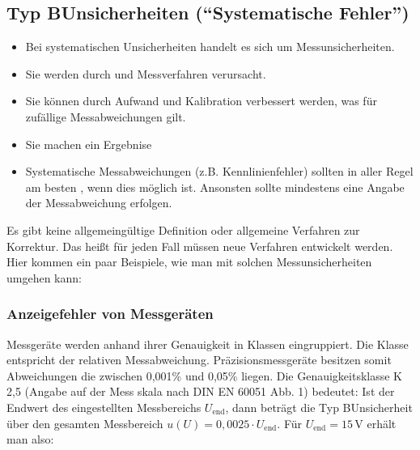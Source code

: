 \documentclass[letterpaper,10pt,english]{jupyterBook}
\begin{document}
\subsection{Typ B\sphinxhyphen{}Unsicherheiten (“Systematische Fehler”)}
\label{\detokenize{content/1_Messunsicherheiten:typ-b-unsicherheiten-systematische-fehler}}\begin{itemize}
\item {} 
\sphinxAtStartPar
Bei systematischen Unsicherheiten handelt es sich um  Messunsicherheiten.

\item {} 
\sphinxAtStartPar
Sie werden durch  und Messverfahren verursacht.

\item {} 
\sphinxAtStartPar
Sie können durch Aufwand und Kalibration verbessert werden, was  für zufällige Messabweichungen gilt.

\item {} 
\sphinxAtStartPar
Sie machen ein Ergebnise 

\item {} 
\sphinxAtStartPar
Systematische Messabweichungen (z.B. Kennlinienfehler) sollten in aller Regel am besten , wenn dies möglich ist. Ansonsten sollte mindestens eine Angabe der Messabweichung erfolgen.

\end{itemize}

\sphinxAtStartPar
Es gibt keine allgemeingültige Definition oder allgemeine Verfahren zur Korrektur. Das heißt für jeden Fall müssen neue Verfahren entwickelt werden. Hier kommen ein paar Beispiele, wie man mit solchen  Messunsicherheiten umgehen kann:


\subsubsection{Anzeigefehler von Messgeräten}
\label{\detokenize{content/1_Messunsicherheiten:anzeigefehler-von-messgeraten}}
\sphinxAtStartPar
Messgeräte werden anhand ihrer Genauigkeit in Klassen eingruppiert. Die Klasse entspricht der relativen Messabweichung. Präzisionsmessgeräte besitzen somit Abweichungen die zwischen 0,001\% und 0,05\% liegen. Die Genauigkeitsklasse K 2,5 (Angabe auf der Mess\sphinxhyphen{} skala nach DIN EN 60051 Abb. 1) bedeutet: Ist der Endwert des eingestellten Messbereichs \(U_\mathrm{end}\), dann beträgt die Typ B\sphinxhyphen{}Unsicherheit über den gesamten Messbereich \(u(U) = 0,0025\cdot U_\mathrm{end}\). Für \(U_\mathrm{end} = 15\,\mathrm V\) erhält man also:
\end{document}
